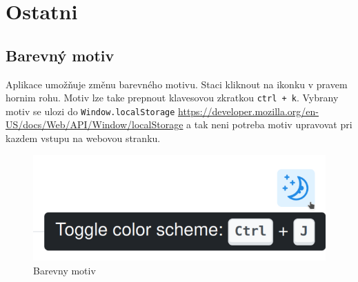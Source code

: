 
\section{Ostatni}\label{sec:ostatni}

\subsection{Barevný motiv}\label{subsec:barevny-motiv}
Aplikace umožňuje změnu barevného motivu.
Staci kliknout na ikonku v pravem hornim rohu.
Motiv lze take prepnout klavesovou zkratkou \texttt{ctrl + k}.
Vybrany motiv se ulozi do \texttt{Window.localStorage}
\url{https://developer.mozilla.org/en-US/docs/Web/API/Window/localStorage}
a tak neni potreba motiv upravovat pri kazdem vstupu na webovou stranku.

\begin{figure}
    \centering
    \includegraphics[scale=0.7]{assets/images/color-scheme}
    \caption{Barevny motiv}\label{fig:barevny-motiv}
\end{figure}
